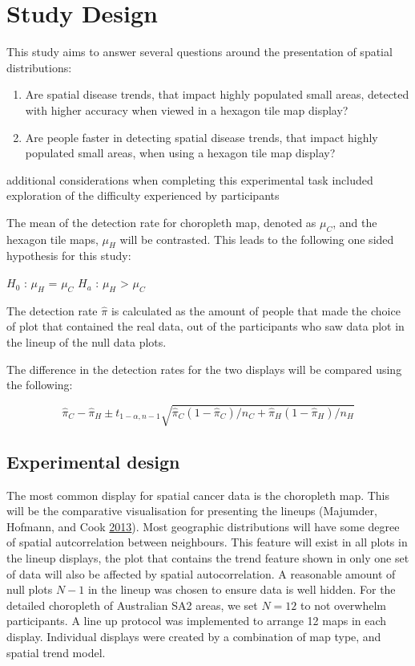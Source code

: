\documentclass[conference,final,]{IEEEtran}
\begin{document}
\hypertarget{study-design}{%
\section{Study Design}\label{study-design}}

This study aims to answer several questions around the presentation of
spatial distributions:

\begin{enumerate}
\def\labelenumi{\arabic{enumi}.}
\item
  Are spatial disease trends, that impact highly populated small areas,
  detected with higher accuracy when viewed in a hexagon tile map
  display?
\item
  Are people faster in detecting spatial disease trends, that impact
  highly populated small areas, when using a hexagon tile map display?
\end{enumerate}

additional considerations when completing this experimental task
included exploration of the difficulty experienced by participants

The mean of the detection rate for choropleth map, denoted as \(\mu_C\),
and the hexagon tile maps, \(\mu_H\) will be contrasted. This leads to
the following one sided hypothesis for this study:

\(H_0\) : \(\mu_H\) = \(\mu_C\) \(H_a\) : \(\mu_H\) \textgreater{}
\(\mu_C\)

The detection rate \(\hat\pi\) is calculated as the amount of people
that made the choice of plot that contained the real data, out of the
participants who saw data plot in the lineup of the null data plots.

The difference in the detection rates for the two displays will be
compared using the following:

\[ \hat\pi_C - \hat\pi_H \pm t_{1-\alpha,n-1}\sqrt{\hat\pi_C(1-\hat\pi_C)/n_C + \hat\pi_H(1-\hat\pi_H)/n_H} \]

\hypertarget{experimental-design}{%
\subsection{Experimental design}\label{experimental-design}}

The most common display for spatial cancer data is the choropleth map.
This will be the comparative visualisation for presenting the lineups
(Majumder, Hofmann, and Cook \protect\hyperlink{ref-VVSIALM}{2013}).
Most geographic distributions will have some degree of spatial
autcorrelation between neighbours. This feature will exist in all plots
in the lineup displays, the plot that contains the trend feature shown
in only one set of data will also be affected by spatial
autocorrelation. A reasonable amount of null plots \(N-1\) in the lineup
was chosen to ensure data is well hidden. For the detailed choropleth of
Australian SA2 areas, we set \(N = 12\) to not overwhelm participants. A
line up protocol was implemented to arrange 12 maps in each display.
Individual displays were created by a combination of map type, and
spatial trend model.
\end{document}
